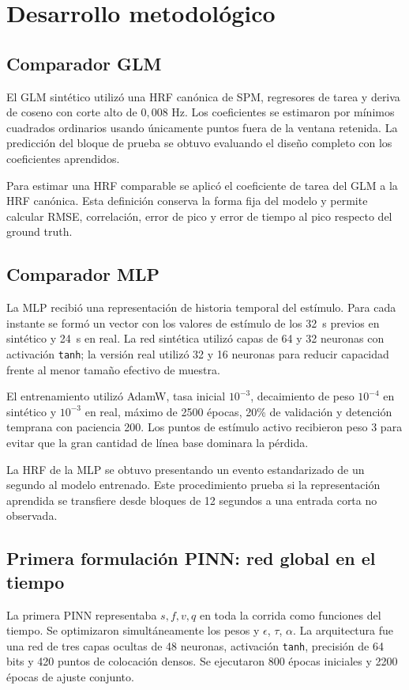 \chapter{Desarrollo metodológico}

\section{Comparador GLM}
El GLM sintético utilizó una HRF canónica de SPM, regresores de tarea y deriva de coseno con corte alto de $0{,}008$ Hz. Los coeficientes se estimaron por mínimos cuadrados ordinarios usando únicamente puntos fuera de la ventana retenida. La predicción del bloque de prueba se obtuvo evaluando el diseño completo con los coeficientes aprendidos.

Para estimar una HRF comparable se aplicó el coeficiente de tarea del GLM a la HRF canónica. Esta definición conserva la forma fija del modelo y permite calcular RMSE, correlación, error de pico y error de tiempo al pico respecto del ground truth.

\section{Comparador MLP}
La MLP recibió una representación de historia temporal del estímulo. Para cada instante se formó un vector con los valores de estímulo de los \SI{32}{s} previos en sintético y \SI{24}{s} en real. La red sintética utilizó capas de 64 y 32 neuronas con activación \texttt{tanh}; la versión real utilizó 32 y 16 neuronas para reducir capacidad frente al menor tamaño efectivo de muestra.

El entrenamiento utilizó AdamW, tasa inicial $10^{-3}$, decaimiento de peso $10^{-4}$ en sintético y $10^{-3}$ en real, máximo de 2500 épocas, 20\% de validación y detención temprana con paciencia 200. Los puntos de estímulo activo recibieron peso 3 para evitar que la gran cantidad de línea base dominara la pérdida.

La HRF de la MLP se obtuvo presentando un evento estandarizado de un segundo al modelo entrenado. Este procedimiento prueba si la representación aprendida se transfiere desde bloques de 12 segundos a una entrada corta no observada.

\section{Primera formulación PINN: red global en el tiempo}
La primera PINN representaba $s,f,v,q$ en toda la corrida como funciones del tiempo. Se optimizaron simultáneamente los pesos y $\epsilon$, $\tau$, $\alpha$. La arquitectura fue una red de tres capas ocultas de 48 neuronas, activación \texttt{tanh}, precisión de 64 bits y 420 puntos de colocación densos. Se ejecutaron 800 épocas iniciales y 2200 épocas de ajuste conjunto.

